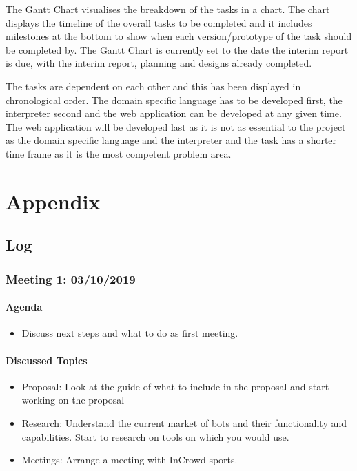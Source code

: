 \documentclass[chapterprefix=false]{scrreprt}
\begin{document}
The Gantt Chart visualises the breakdown of the tasks in a chart. The chart displays the timeline of the overall tasks to be completed and it includes milestones at the bottom to show when each version/prototype of the task should be completed by. The Gantt Chart is currently set to the date the interim report is due, with the interim report, planning and designs already completed.

The tasks are dependent on each other and this has been displayed in chronological order. The domain specific language has to be developed first, the interpreter second and the web application can be developed at any given time. The web application will be developed last as it is not as essential to the project as the domain specific language and the interpreter and the task has a shorter time frame as it is the most competent problem area.


\chapter{Appendix}

\section{Log}

\subsection{Meeting 1: 03/10/2019}

\subsubsection{Agenda}

\begin{itemize}
 \setlength\itemsep{-0.75em}
 \item Discuss next steps and what to do as first meeting.
\end{itemize}

\subsubsection{Discussed Topics}

\begin{itemize}
 \setlength\itemsep{-0.75em}
 \item Proposal: Look at the guide of what to include in the proposal and start working on the proposal
 \item Research: Understand the current market of bots and their functionality and capabilities. Start to research on tools on which you would use.
 \item Meetings: Arrange a meeting with InCrowd sports.
\end{itemize}
\end{document}
